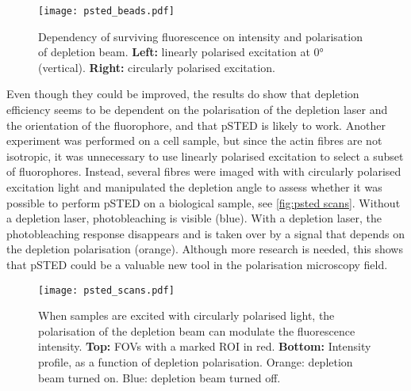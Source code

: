 \begin{figure}
	\centering
	\texttt{[image: psted\_beads.pdf]}
	\caption{
		Dependency of surviving fluorescence on intensity and polarisation of depletion beam. \textbf{Left:} linearly polarised excitation at 0° (vertical). \textbf{Right:} circularly polarised excitation.
	}
	\label{fig:psted beads}
\end{figure}

Even though they could be improved, the results do show that depletion efficiency seems to be dependent on the polarisation of the depletion laser and the orientation of the fluorophore, and that pSTED is likely to work. Another experiment was performed on a cell sample, but since the actin fibres are not isotropic, it was unnecessary to use linearly polarised excitation to select a subset of fluorophores. Instead, several fibres were imaged with with circularly polarised excitation light and manipulated the depletion angle to assess whether it was possible to perform pSTED on a biological sample, see \autoref{fig:psted scans}. Without a depletion laser, photobleaching is visible (blue). With a depletion laser, the photobleaching response disappears and is taken over by a signal that depends on the depletion polarisation (orange). Although more research is needed, this shows that pSTED could be a valuable new tool in the polarisation microscopy field.

\begin{figure}
	\centering
	\texttt{[image: psted\_scans.pdf]}
	\caption{
		When samples are excited with circularly polarised light, the polarisation of the depletion beam can modulate the fluorescence intensity. \textbf{Top:} FOVs with a marked ROI in red. \textbf{Bottom:} Intensity profile, as a function of depletion polarisation. Orange: depletion beam turned on. Blue: depletion beam turned off.
	}
	\label{fig:psted scans}
\end{figure}




























